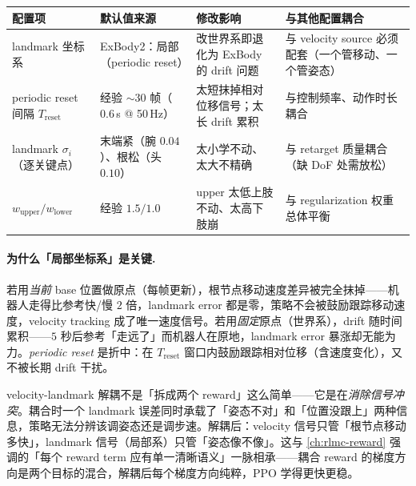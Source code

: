 \begin{center}
\small
\begin{tabular}{p{2.6cm}p{2.8cm}p{3.0cm}p{3.0cm}}
\hline
配置项 & 默认值来源 & 修改影响 & 与其他配置耦合 \\
\hline
landmark 坐标系 & ExBody2：局部（periodic reset） & 改世界系即退化为 ExBody 的 drift 问题 & 与 velocity source 必须配套（一个管移动、一个管姿态） \\
periodic reset 间隔 $T_{\mathrm{reset}}$ & 经验 $\sim 30$ 帧（$0.6$\,s @ 50\,Hz） & 太短抹掉相对位移信号；太长 drift 累积 & 与控制频率、动作时长耦合 \\
landmark $\sigma_i$（逐关键点） & 末端紧（腕 $0.04$）、根松（头 $0.10$） & 太小学不动、太大不精确 & 与 retarget 质量耦合（缺 DoF 处需放松） \\
$w_{\mathrm{upper}}/w_{\mathrm{lower}}$ & 经验 $1.5/1.0$ & upper 太低上肢不动、太高下肢崩 & 与 regularization 权重总体平衡 \\
\hline
\end{tabular}
\end{center}


\paragraph{为什么「局部坐标系」是关键.}
若用\emph{当前} base 位置做原点（每帧更新），根节点移动速度差异被完全抹掉——机器人走得比参考快/慢 $2$ 倍，landmark error 都是零，策略不会被鼓励跟踪移动速度，velocity tracking 成了唯一速度信号。若用\emph{固定}原点（世界系），drift 随时间累积——$5$ 秒后参考「走远了」而机器人在原地，landmark error 暴涨却无能为力。\emph{periodic reset} 是折中：在 $T_{\mathrm{reset}}$ 窗口内鼓励跟踪相对位移（含速度变化），又不被长期 drift 干扰。

\begin{insight}\label{ins:rlmc-wbc-decouple}
velocity-landmark 解耦不是「拆成两个 reward」这么简单——它是在\emph{消除信号冲突}。耦合时一个 landmark 误差同时承载了「姿态不对」和「位置没跟上」两种信息，策略无法分辨该调姿态还是调步速。解耦后：velocity 信号只管「根节点移动多快」，landmark 信号（局部系）只管「姿态像不像」。这与 \cref{ch:rlmc-reward} 强调的「每个 reward term 应有单一清晰语义」一脉相承——耦合 reward 的梯度方向是两个目标的混合，解耦后每个梯度方向纯粹，PPO 学得更快更稳。
\end{insight}

